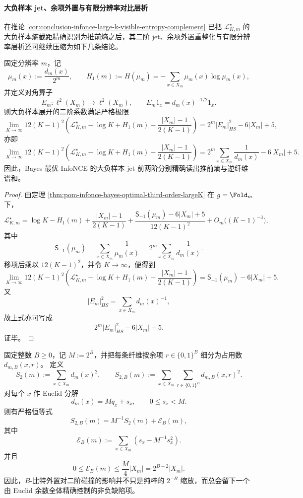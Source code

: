 \paragraph{大负样本 jet、余项外置与有限分辨率对比层析}
在推论 \ref{cor:conclusion-infonce-large-k-visible-entropy-complement} 已把
\(\mathcal L_{K,m}^\star\) 的大负样本熵截距精确识别为推前熵之后，其二阶 jet、余项外置重整化与有限分辨率层析还可继续压缩为如下几条结论。

\begin{theorem}[大负样本二阶系数的逆多重度定理]\label{thm:conclusion-infonce-second-jet-reciprocal-multiplicity}
固定分辨率 \(m\)，记
\[
\mu_m(x):=\frac{d_m(x)}{2^m},
\qquad
H_1(m):=H(\mu_m)=-\sum_{x\in X_m}\mu_m(x)\log \mu_m(x),
\]
并定义对角算子
\[
E_m:\ell^2(X_m)\to \ell^2(X_m),
\qquad
E_m1_x=d_m(x)^{-1/2}1_x.
\]
则大负样本展开的二阶系数满足严格极限
\[
\lim_{K\to\infty}
12(K-1)^2
\left(
\mathcal L_{K,m}^\star-\log K+H_1(m)-\frac{|X_m|-1}{2(K-1)}
\right)
=
2^m|E_m|_{HS}^2-6|X_m|+5,
\]
亦即
\[
\lim_{K\to\infty}
12(K-1)^2
\left(
\mathcal L_{K,m}^\star-\log K+H_1(m)-\frac{|X_m|-1}{2(K-1)}
\right)
=
2^m\sum_{x\in X_m}\frac1{d_m(x)}-6|X_m|+5.
\]
因此，Bayes 最优 InfoNCE 的大负样本 jet 前两阶分别精确读出推前熵与逆纤维谱和。
\end{theorem}

\begin{proof}
由定理 \ref{thm:pom-infonce-bayes-optimal-third-order-largeK} 在 \(g=\Fold_m\) 下，
\[
\mathcal L_{K,m}^\star
=
\log K-H_1(m)
+\frac{|X_m|-1}{2(K-1)}
+\frac{\mathsf S_{-1}(\mu_m)-6|X_m|+5}{12(K-1)^2}
+O_m\!\bigl((K-1)^{-3}\bigr),
\]
其中
\[
\mathsf S_{-1}(\mu_m)=\sum_{x\in X_m}\frac1{\mu_m(x)}
=
2^m\sum_{x\in X_m}\frac1{d_m(x)}.
\]
移项后乘以 \(12(K-1)^2\)，并令 \(K\to\infty\)，便得到
\[
\lim_{K\to\infty}
12(K-1)^2
\left(
\mathcal L_{K,m}^\star-\log K+H_1(m)-\frac{|X_m|-1}{2(K-1)}
\right)
=
\mathsf S_{-1}(\mu_m)-6|X_m|+5.
\]
又
\[
|E_m|_{HS}^2=\sum_{x\in X_m}d_m(x)^{-1},
\]
故上式亦可写成
\[
2^m|E_m|_{HS}^2-6|X_m|+5.
\]
证毕。
\end{proof}

\begin{theorem}\label{thm:conclusion-remainder-bits-euclid-defect-exact}
固定整数 \(B\ge 0\)，记 \(M:=2^B\)，并把每条纤维按余项
\(r\in\{0,1\}^B\) 细分为占用数 \(d_{m,B}(x,r)\)。
定义
\[
S_2(m):=\sum_{x\in X_m}d_m(x)^2,
\qquad
S_{2,B}(m):=\sum_{x\in X_m}\sum_{r\in\{0,1\}^B}d_{m,B}(x,r)^2.
\]
对每个 \(x\) 作 Euclid 分解
\[
d_m(x)=Mq_x+s_x,
\qquad
0\le s_x<M.
\]
则有严格恒等式
\[
S_{2,B}(m)=M^{-1}S_2(m)+\mathcal E_B(m),
\]
其中
\[
\mathcal E_B(m):=
\sum_{x\in X_m}\left(s_x-M^{-1}s_x^2\right).
\]
并且
\[
0\le \mathcal E_B(m)\le \frac{M}{4}|X_m|=2^{B-2}|X_m|.
\]
因此，\(B\)-比特外置对二阶碰撞的影响并不只是纯粹的 \(2^{-B}\) 缩放，而总会留下一个由 Euclid 余数全体精确控制的非负缺陷项。
\end{theorem}


